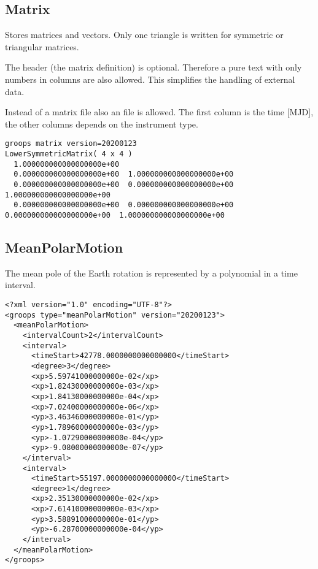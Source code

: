 \subsection{Matrix}\label{general.fileFormat:matrix}
Stores matrices and vectors. Only one triangle is written for symmetric or triangular matrices.

The header (the matrix definition) is optional.
Therefore a pure text with only numbers in columns are also allowed.
This simplifies the handling of external data.

Instead of a matrix file also an  file is allowed.
The first column is the time [MJD], the other columns depends on the instrument type.

\begin{verbatim}
groops matrix version=20200123
LowerSymmetricMatrix( 4 x 4 )
  1.000000000000000000e+00
  0.000000000000000000e+00  1.000000000000000000e+00
  0.000000000000000000e+00  0.000000000000000000e+00  1.000000000000000000e+00
  0.000000000000000000e+00  0.000000000000000000e+00  0.000000000000000000e+00  1.000000000000000000e+00
\end{verbatim}



\subsection{MeanPolarMotion}\label{general.fileFormat:meanPolarMotion}
The mean pole of the Earth rotation is represented by a polynomial in a time interval.

\begin{verbatim}
<?xml version="1.0" encoding="UTF-8"?>
<groops type="meanPolarMotion" version="20200123">
  <meanPolarMotion>
    <intervalCount>2</intervalCount>
    <interval>
      <timeStart>42778.0000000000000000</timeStart>
      <degree>3</degree>
      <xp>5.59741000000000e-02</xp>
      <xp>1.82430000000000e-03</xp>
      <xp>1.84130000000000e-04</xp>
      <xp>7.02400000000000e-06</xp>
      <yp>3.46346000000000e-01</yp>
      <yp>1.78960000000000e-03</yp>
      <yp>-1.07290000000000e-04</yp>
      <yp>-9.08000000000000e-07</yp>
    </interval>
    <interval>
      <timeStart>55197.0000000000000000</timeStart>
      <degree>1</degree>
      <xp>2.35130000000000e-02</xp>
      <xp>7.61410000000000e-03</xp>
      <yp>3.58891000000000e-01</yp>
      <yp>-6.28700000000000e-04</yp>
    </interval>
  </meanPolarMotion>
</groops>
\end{verbatim}


